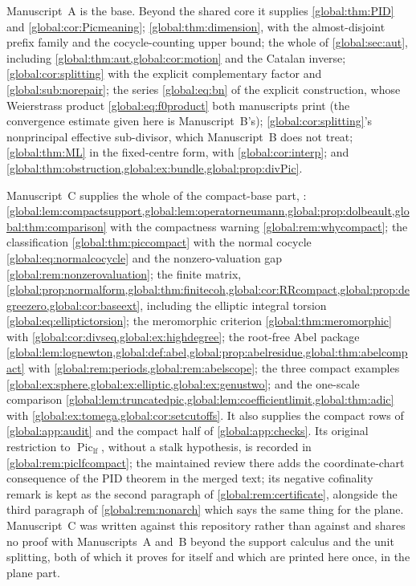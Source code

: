 \documentclass[11pt,letterpaper]{article}
\theoremstyle{definition}
\theoremstyle{remark}
\newcommand{\Piclf}{\operatorname{Pic}_{\mathrm{lf}}}
\numberwithin{equation}{section}
\begin{document}
Manuscript~A is the base. Beyond the shared core it supplies \cref{global:thm:PID} and \cref{global:cor:Picmeaning}; \cref{global:thm:dimension}, with the almost-disjoint prefix family and the cocycle-counting upper bound; the whole of \cref{global:sec:aut}, including \cref{global:thm:aut,global:cor:motion} and the Catalan inverse; \cref{global:cor:splitting} with the explicit complementary factor and \cref{global:sub:norepair}; the series \eqref{global:eq:bn} of the explicit construction, whose
Weierstrass product \eqref{global:eq:f0product} both manuscripts print (the
convergence estimate given here is Manuscript~B's);
\cref{global:cor:splitting}'s nonprincipal effective sub-divisor, which
Manuscript~B does not treat; \cref{global:thm:ML} in the fixed-centre form, with \cref{global:cor:interp}; and \cref{global:thm:obstruction,global:ex:bundle,global:prop:divPic}.

Manuscript~C supplies the whole of the compact-base part, : \cref{global:lem:compactsupport,global:lem:operatorneumann,global:prop:dolbeault,global:thm:comparison} with the compactness warning \cref{global:rem:whycompact}; the classification \cref{global:thm:piccompact} with the normal cocycle \eqref{global:eq:normalcocycle} and the nonzero-valuation gap \cref{global:rem:nonzerovaluation}; the finite matrix, \cref{global:prop:normalform,global:thm:finitecoh,global:cor:RRcompact,global:prop:degreezero,global:cor:baseext}, including the elliptic integral torsion \eqref{global:eq:elliptictorsion}; the meromorphic criterion \cref{global:thm:meromorphic} with \cref{global:cor:divseq,global:ex:highdegree}; the root-free Abel package \cref{global:lem:lognewton,global:def:abel,global:prop:abelresidue,global:thm:abelcompact} with \cref{global:rem:periods,global:rem:abelscope}; the three compact examples \cref{global:ex:sphere,global:ex:elliptic,global:ex:genustwo}; and the one-scale comparison \cref{global:lem:truncatedpic,global:lem:coefficientlimit,global:thm:adic} with \cref{global:ex:tomega,global:cor:setcutoffs}. It also supplies the compact rows of \cref{global:app:audit} and the compact half of \cref{global:app:checks}. Its original restriction to $\Piclf$, without a stalk hypothesis, is recorded in \cref{global:rem:piclfcompact}; the maintained review there adds the coordinate-chart consequence of the PID theorem in the merged text; its negative cofinality remark is kept as the second paragraph of \cref{global:rem:certificate}, alongside the third paragraph of \cref{global:rem:nonarch} which says the same thing for the plane. Manuscript~C was written against this repository rather than against \cite{Source} and shares no proof with Manuscripts~A and~B beyond the support calculus and the unit splitting, both of which it proves for itself and which are printed here once, in the plane part.
\end{document}
